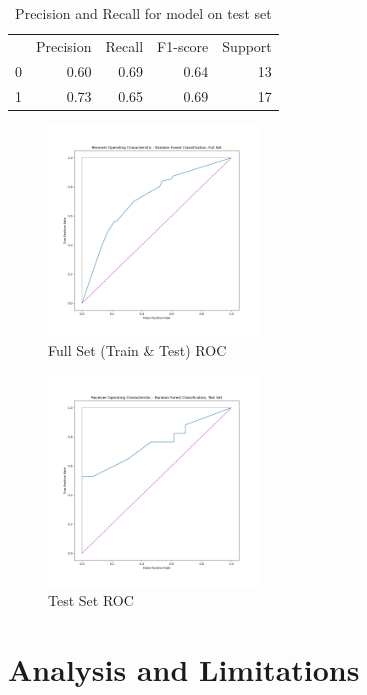 \documentclass[conference]{IEEEtran}
\begin{document}
\begin{table}[hb]
	\centering
	\begin{tabular}{rrrrr}
		  & Precision & Recall & F1-score & Support \\[6pt]
		0 & 0.60      & 0.69   & 0.64     & 13      \\
		1 & 0.73      & 0.65   & 0.69     & 17      \\[6pt]
	\end{tabular}
	\caption{Precision and Recall for model on test set}
	\label{precisionandrecall}
\end{table}

\begin{figure}[hb]
	\centering
	\includegraphics[width=0.5\textwidth]{full_set_auc.png}
	\caption{Full Set (Train \& Test) ROC}
	\label{fullsetroc}
\end{figure}

\begin{figure}[t]
	\centering
	\includegraphics[width=0.5\textwidth]{test_set_auc.png}
	\caption{Test Set ROC}
	\label{testsetroc}
\end{figure}

\section{Analysis and Limitations}
\end{document}
